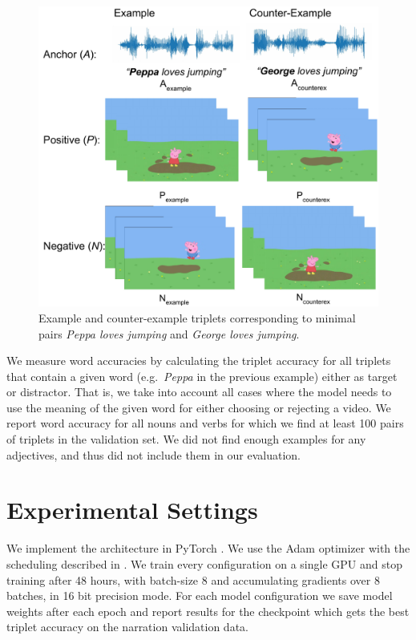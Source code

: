 \begin{figure}[ht]
  \centering
  \includegraphics[width=\columnwidth]{peppa_targeted_triplets.pdf}
  \caption{Example and counter-example triplets corresponding to minimal pairs {\it Peppa loves jumping} and {\it George loves jumping}.}
  \label{fig:minimal_pairs}
\end{figure}

We measure word accuracies by calculating the triplet accuracy 
for all triplets that contain a given word (e.g.\ 
\textit{Peppa} in the previous example) either as target or distractor. 
That is, we take into account all cases where the model needs to use 
the meaning of the given word for either choosing or rejecting a video. 
%
We report word accuracy for all nouns and verbs for which we find at least 
100 pairs of triplets in the validation set. We did not find enough examples for any 
adjectives, and thus did not include them in our evaluation.



\section{Experimental Settings}
We implement the architecture in PyTorch \citep{NEURIPS2019_9015}. We
use the Adam optimizer \citep{kingma2014adam} with the scheduling
described in \citep{devlin-etal-2019-bert}. We train every
configuration on a single GPU and stop training after 48 hours, with
batch-size 8 and accumulating gradients over 8 batches, in 16 bit
precision mode. For each model configuration we save model weights
after each epoch and report results for the checkpoint which gets the
best triplet accuracy on the narration validation data. 

